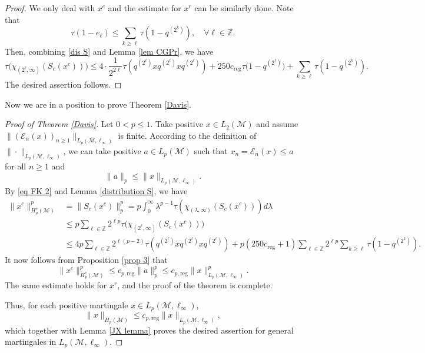 \documentclass[11]{amsart}
\numberwithin{equation}{section}
\newcommand{\M}{\mathcal{M}}
\begin{document}
\begin{proof}
	We only deal with $x^c$ and the estimate for $x^r$ can be similarly done.  	Note that \[\tau(1-e_{\ell})\leq \sum_{k\geq \ell}\tau(1-q^{(2^k)}),\quad \forall \ell\in\mathbb{Z}.\]
	Then, combining \eqref{dis S} and Lemma \ref{lem CGPr}, we have
	\[	\tau\Big(\chi_{(2^{\ell},\infty)}(S_c(x^c))\Big)\leq  4\cdot\frac{1}{2^{2\ell}} \tau(q^{(2^\ell)}xq^{(2^\ell)}xq^{(2^\ell)})+250c_{\mathrm{reg}} \tau\Big(1-q^{(2^\ell)}\Big)+\sum_{k\geq \ell}\tau(1-q^{(2^k)}).\]
	The desired assertion follows. 
\end{proof}


Now we are in a position to prove Theorem \ref{Davis}.
\begin{proof}[Proof of Theorem \ref{Davis}]
	Let $0<p\leq 1$. Take positive $x\in L_2(\mathcal{M})$ and assume  $\|(\mathcal{E}_n(x))_{n\geq1}\|_{L_p(\M,\ell_{\infty})}$ is finite. 	According to the definition of $\|\cdot\|_{L_p(\mathcal{M},\ell_{\infty})}$, we can take positive $a\in L_p(\mathcal{M})$   such that $x_n=\mathcal{E}_n(x)\leq a$ for all $n\geq1$ and 
	$$\|a\|_p\leq \|x\|_{L_p(\mathcal{M},\ell_{\infty})}.$$
	By \eqref{eq FK 2} and Lemma \ref{distribution S}, we have 
	\begin{equation}\label{Scyc}
		\begin{aligned}
			\|x^c\|_{H_p^c(\M)}^p&=\|S_c(x^c)\|_p^p=p\int_0^{\infty}\lambda^{p-1}\tau(\chi_{(\lambda,\infty)}(S_c(x^c))) d\lambda\\
			&\leq p\sum_{\ell\in\mathbb{Z}} 2^{\ell p}\tau\Big(\chi_{(2^{\ell},\infty)}(S_c(x^c))\Big)\\
			&\leq 4p\sum_{\ell\in\mathbb{Z}} 2^{\ell(p-2)} \tau(q^{(2^{\ell})}xq^{(2^{\ell})}xq^{(2^{\ell})})+p(250c_{\mathrm{reg}}+1)\sum_{\ell\in\mathbb{Z}} 2^{\ell p}\sum_{k\geq \ell}\tau(1-q^{(2^k)}).
		\end{aligned}
	\end{equation}
	It now follows from Proposition \ref{prop 3} that 
	$$\|x^c\|_{H_p^c(\M)}^p\leq c_{p,\mathrm{reg}}\|a\|_p^p\leq c_{p,\mathrm{reg}}\|x\|_{L_p(\mathcal{M},\ell_{\infty})}^p.$$
	The same estimate holds for $x^r$, and the proof of the theorem is complete. 

	Thus, for each positive martingale $x\in L_p(\mathcal{M},\ell_{\infty})$,
	$$\|x\|_{H_p(\mathcal{M})}\leq c_{p,\mathrm{reg}}\|x\|_{L_p(\mathcal{M},\ell_{\infty})},$$
	which together with Lemma \ref{JX lemma} proves the desired assertion for general martingales in $L_p(\mathcal{M},\ell_{\infty})$.
	
	
\end{proof}
\end{document}
